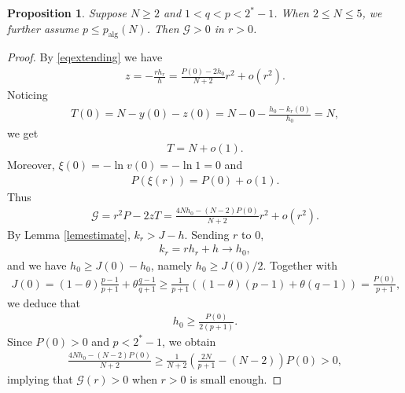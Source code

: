 \documentclass{article}
\newtheorem{proposition}[theorem]{Proposition}
\theoremstyle{definition} \theoremstyle{remark}
\numberwithin{equation}{section}
\newcommand{\G}{\mathcal{G}}
\begin{document}
	\begin{proposition} \label{propG>01}
		Suppose $N \ge 2$ and $1 < q < p < 2^* -1$. When $2 \le N \le 5$, we further assume $p \le p_{\text{alg}}(N)$. Then $\G > 0$ in $r > 0$.
	\end{proposition}

	\begin{proof}
		By \eqref{eqextending} we have
		\begin{align} \label{expandingofz}
			z = -\frac{rh_r}{h} = \frac{P(0) - 2h_0}{N+2} r^2 + o(r^2).
		\end{align}
		Noticing
		\begin{align*}
			T(0) = N - y(0) - z(0) = N - 0 - \frac{h_0 - k_r(0)}{h_0} = N,
		\end{align*}
		we get
		\begin{align*}
			T = N + o(1).
		\end{align*}
		Moreover, $\xi(0) = -\ln v(0) = -\ln 1 = 0$ and
		\begin{align*}
			P(\xi(r)) = P(0) + o(1).
		\end{align*}
		Thus
		\begin{align*}
			\G = r^2P - 2zT = \frac{4Nh_0 - (N-2)P(0)}{N+2}r^2 + o(r^2).
		\end{align*}
		By Lemma \ref{lemestimate}, $k_r > J -h$. Sending $r$ to $0$,
		\begin{align*}
			k_r = rh_r + h \to h_0,
		\end{align*}
		and we have $h_0 \ge J(0) - h_0$, namely $h_0 \ge J(0)/2$. Together with
		\begin{align*}
			J(0) = (1-\theta)\frac{p-1}{p+1} + \theta \frac{q-1}{q+1} \ge \frac{1}{p+1} \left((1-\theta)(p-1) + \theta (q-1)\right) = \frac{P(0)}{p+1},
		\end{align*}
		we deduce that
		\begin{align*}
			h_0 \ge \frac{P(0)}{2(p+1)}.
		\end{align*}
		Since $P(0) > 0$ and $p < 2^*-1$, we obtain
		\begin{align*}
			\frac{4Nh_0 - (N-2)P(0)}{N+2} \ge \frac{1}{N+2}\left(\frac{2N}{p+1} - (N-2)\right)P(0) > 0,
		\end{align*}
		implying that $\G(r) > 0$ when $r > 0$ is small enough.


\end{proof}
\end{document}
